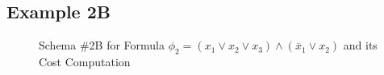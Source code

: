 \documentclass{llncs}
\newcommand{\obar}[1]{\overline{#1}}
\begin{document}
\subsection{Example 2B}

\begin{figure}
\caption{Schema \#2B for Formula $\phi_2 = (x_1 \lor x_2 \lor x_3) \land (\obar{x}_1 \lor x_2)$ and its Cost Computation}
\label{fig:p2-cdcl:schema}
\end{figure}
\end{document}
